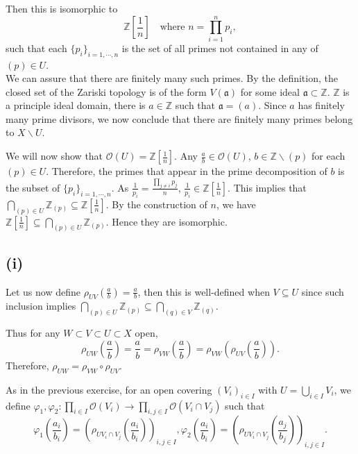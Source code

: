 \documentclass{article}
\begin{document}
Then this is isomorphic to 
\begin{equation*}
\mathbb{Z}\left[{\frac 1 n}\right]\quad\text{where }n=\prod_{i=1}^n p_i,
\end{equation*}
such that each $\{p_i\}_{i=1,\cdots,n}$ is the set of all primes not contained in any of $(p)\in U$.\\
We can assure that there are finitely many such primes. By the definition, the closed set of the Zariski topology is of the form $V(\mathfrak{a})$ for some ideal $\mathfrak{a}\subset\mathbb{Z}$. $\mathbb{Z}$ is a principle ideal domain, there is $a\in\mathbb{Z}$ such that $\mathfrak{a} = (a)$. Since $a$ has finitely many prime divisors, we now conclude that there are finitely many primes belong to $X\backslash U$.\\
\par We will now show that $\mathcal{O}(U)=\mathbb{Z}\left[{\frac 1 n}\right]$. Any ${\frac a b}\in\mathcal{O}(U)$, $b\in\mathbb{Z}\backslash (p)$ for each $(p)\in U$. Therefore, the primes that appear in the prime decomposition of $b$ is the subset of  $\{p_i\}_{i=1,\cdots,n}$. As ${\frac 1 {p_i}} ={\frac {\prod_{j\not=i} p_j} {n}}$, ${\frac 1 {p_i}}\in\mathbb{Z}[{\frac 1 n}]$. This implies that $\bigcap_{(p)\in U} \mathbb{Z}_{(p)}\subseteq \mathbb{Z}[{\frac 1 n}]$. By the construction of $n$, we have $\mathbb{Z}[{\frac 1 n}]\subseteq \bigcap_{(p)\in U} \mathbb{Z}_{(p)}$. Hence they are isomorphic.\\

\subsection*{(i)}

\par Let us now define $\rho_{UV}({\frac a b}) = {\frac a b}$, then this is well-defined when $V\subseteq U$ since such inclusion implies $\bigcap_{(p)\in U} \mathbb{Z}_{(p)}\subseteq \bigcap_{(q)\in V} \mathbb{Z}_{(q)}$.\\

\par Thus for any $W\subset V\subset U\subset X$ open,
\begin{equation*}
\rho_{UW}\left({\frac a b}\right) = {\frac a b} = \rho_{VW}\left({\frac a b}\right) = \rho_{VW}\left(\rho_{UV}\left({\frac a b}\right)\right).
\end{equation*}
Therefore, $\rho_{UW}=\rho_{VW}\circ\rho_{UV}$.\\
\par As in the previous exercise, for an open covering $(V_i)_{i\in I}$ with $U=\bigcup_{i\in I}V_i$, we define $\varphi_1,\varphi_2:\prod_{i\in I}\mathcal{O}(V_i)\to\prod_{i,j\in I}\mathcal{O}(V_i\cap V_j)$ such that
\begin{equation*}
\varphi_1\left({\frac {a_i} {b_i}}\right) = \left(\rho_{UV_i\cap V_j}\left({\frac {a_i} {b_i}}\right)\right)_{i,j\in I}, \varphi_2\left({\frac {a_i} {b_i}}\right) = \left(\rho_{UV_i\cap V_j}\left({\frac {a_j} {b_j}}\right)\right)_{i,j\in I}.
\end{equation*}
\end{document}

